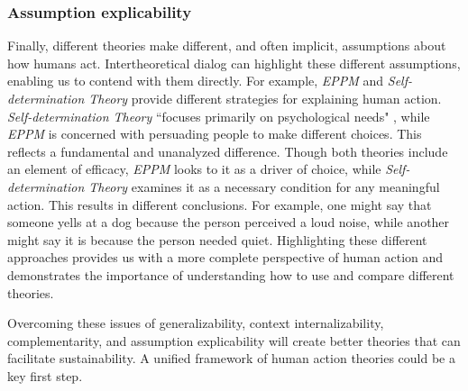 \documentclass[12 pt]{article}
\begin{document}
\subsubsection{Assumption explicability}
Finally, different theories make different, and often implicit, assumptions about how humans act. Intertheoretical dialog can highlight these different assumptions, enabling us to contend with them directly. For example, \textit{EPPM} and \textit{Self-determination Theory} provide different strategies for explaining human action. \textit{Self-determination Theory} ``focuses primarily on psychological needs" \parencite[][p. 57]{Ryan2000}, while \textit{EPPM} is concerned with persuading people to make different choices. This reflects a fundamental and unanalyzed difference. Though both theories include an element of efficacy, \textit{EPPM} looks to it as a driver of choice, while \textit{Self-determination Theory} examines it as a necessary condition for any meaningful action.  This results in different conclusions. For example, one might say that someone yells at a dog because the person perceived a loud noise,  while another might say it is because the person needed quiet. Highlighting these different approaches provides us with a more complete perspective of human action and demonstrates the importance of understanding how to use and compare different theories.

Overcoming these issues of generalizability, context internalizability, complementarity, and assumption explicability will create better theories that can facilitate sustainability. A unified framework of human action theories could be a key first step. 
\end{document}
